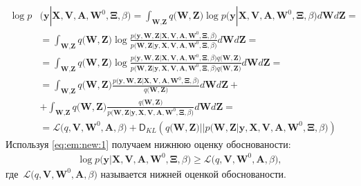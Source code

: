 \[
\label{eq:em:new:1}
\begin{aligned}
\log p&\bigr(\mathbf{y}|\mathbf{X}, \mathbf{V}, \textbf{A}, \textbf{W}^{0}, \bm{\Xi}, \beta\bigr) = \int_{\textbf{W}, \textbf{Z}} q\bigr(\textbf{W}, \textbf{Z}\bigr) \log p\bigr(\mathbf{y}|\mathbf{X}, \mathbf{V}, \textbf{A}, \textbf{W}^{0}, \bm{\Xi}, \beta\bigr)d\textbf{W}d\textbf{Z} =\\
&= \int_{\textbf{W}, \textbf{Z}} q\bigr(\textbf{W}, \textbf{Z}\bigr)\log \frac{p\bigr(\mathbf{y}, \textbf{W}, \textbf{Z}|\mathbf{X}, \mathbf{V}, \textbf{A}, \textbf{W}^{0}, \bm{\Xi}, \beta\bigr)}{p\bigr(\textbf{W}, \textbf{Z}|\mathbf{y}, \mathbf{X}, \mathbf{V}, \textbf{A}, \textbf{W}^{0}, \bm{\Xi}, \beta\bigr)}d\textbf{W}d\textbf{Z}=\\
&= \int_{\textbf{W}, \textbf{Z}} q\bigr(\textbf{W}, \textbf{Z}\bigr)\log \frac{p\bigr(\mathbf{y}, \textbf{W}, \textbf{Z}|\mathbf{X}, \mathbf{V}, \textbf{A}, \textbf{W}^{0}, \bm{\Xi}, \beta\bigr)q\bigr(\textbf{W}, \textbf{Z}\bigr)}{p\bigr(\textbf{W}, \textbf{Z}|\mathbf{y}, \mathbf{X}, \mathbf{V}, \textbf{A}, \textbf{W}^{0}, \bm{\Xi}, \beta\bigr)q\bigr(\textbf{W}, \textbf{Z}\bigr)}d\textbf{W}d\textbf{Z}=\\
&= \int_{\textbf{W}, \textbf{Z}} q\bigr(\textbf{W}, \textbf{Z}\bigr)\frac{p\bigr(\mathbf{y}, \textbf{W}, \textbf{Z}|\mathbf{X}, \mathbf{V}, \textbf{A}, \textbf{W}^{0}, \bm{\Xi}, \beta\bigr)}{q\bigr(\textbf{W}, \textbf{Z}\bigr)}d\textbf{W}d\textbf{Z}+\\
&+\int_{\textbf{W}, \textbf{Z}} q\bigr(\textbf{W}, \textbf{Z}\bigr)\frac{q\bigr(\textbf{W}, \textbf{Z}\bigr)}{p\bigr(\textbf{W}, \textbf{Z}|\mathbf{y}, \mathbf{X}, \mathbf{V}, \textbf{A}, \textbf{W}^{0}, \bm{\Xi}, \beta\bigr)}d\textbf{W}d\textbf{Z}=\\
&=\mathcal{L}\bigr(q, \textbf{V}, \textbf{W}^{0}, \textbf{A}, \beta\bigr)+\mathsf{D}_{KL}\left(q\bigr(\textbf{W}, \textbf{Z}\bigr)||p\bigr(\textbf{W}, \textbf{Z}|\mathbf{y}, \mathbf{X}, \mathbf{V}, \textbf{A}, \textbf{W}^{0}, \bm{\Xi}, \beta\bigr)\right)
\end{aligned}
\]
Используя \eqref{eq:em:new:1} получаем нижнюю оценку обоснованости:
\[
\label{eq:em:new:2}
\begin{aligned}
\log p\bigr(\mathbf{y}|\mathbf{X}, \mathbf{V}, \textbf{A}, \textbf{W}^{0}, \bm{\Xi}, \beta\bigr)\geq \mathcal{L}\bigr(q, \textbf{V}, \textbf{W}^{0}, \textbf{A}, \beta\bigr),
\end{aligned}
\]
где~$\mathcal{L}\bigr(q, \textbf{V}, \textbf{W}^{0}, \textbf{A}, \beta\bigr)$ называется нижней оценкой обоснованости.

